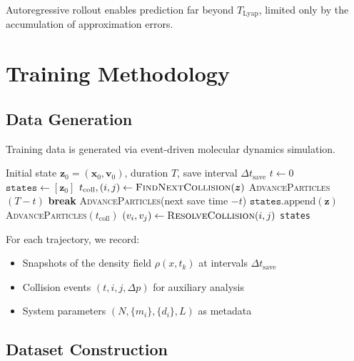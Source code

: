 \documentclass[11pt]{article}
\begin{document}
Autoregressive rollout enables prediction far beyond $T_{\text{Lyap}}$, limited only by the accumulation of approximation errors.

\section{Training Methodology}

\subsection{Data Generation}

Training data is generated via event-driven molecular dynamics simulation.

\begin{algorithm}[H]
\caption{Event-Driven Hard-Sphere Simulation}
\label{alg:simulation}
\begin{algorithmic}[1]
\Require Initial state $\bm{z}_0 = (\bm{x}_0, \bm{v}_0)$, duration $T$, save interval $\Delta t_{\text{save}}$
\State $t \gets 0$
\State $\texttt{states} \gets [\bm{z}_0]$
    \State $t_{\text{coll}}, (i, j) \gets \textsc{FindNextCollision}(\bm{z})$
        \State \textsc{AdvanceParticles}$(T - t)$
        \State \textbf{break}
    \EndIf
        \State \textsc{AdvanceParticles}(next save time $- t$)
        \State $\texttt{states}.\text{append}(\bm{z})$
    \EndWhile
    \State \textsc{AdvanceParticles}$(t_{\text{coll}})$
    \State $(v_i, v_j) \gets \textsc{ResolveCollision}(i, j)$ 
\EndWhile
\State \Return \texttt{states}
\end{algorithmic}
\end{algorithm}

For each trajectory, we record:
\begin{itemize}
    \item Snapshots of the density field $\rho(x, t_k)$ at intervals $\Delta t_{\text{save}}$
    \item Collision events $(t, i, j, \Delta p)$ for auxiliary analysis
    \item System parameters $(N, \{m_i\}, \{d_i\}, L)$ as metadata
\end{itemize}

\subsection{Dataset Construction}
\end{document}
